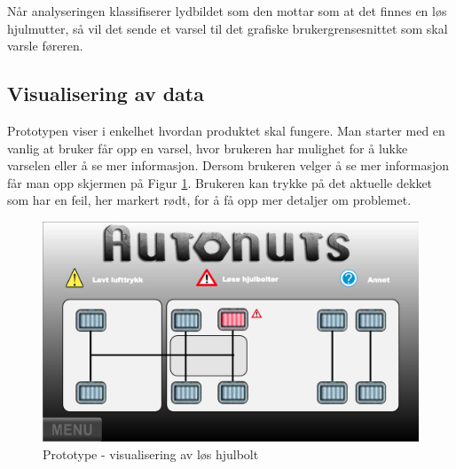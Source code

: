 Når analyseringen klassifiserer lydbildet som den mottar som at det finnes en løs hjulmutter, så vil det sende et varsel til det grafiske brukergrensesnittet som skal varsle føreren.

\subsection{Visualisering av data}
Prototypen viser i enkelhet hvordan produktet skal fungere. Man starter med en vanlig at bruker får opp en varsel, hvor brukeren har mulighet for å lukke varselen eller å se mer informasjon. Dersom brukeren velger å se mer informasjon får man opp skjermen på Figur \ref{fig:proto}. Brukeren kan trykke på det aktuelle dekket som har en feil, her markert rødt, for å få opp mer detaljer om problemet.
\begin{figure}[H]
		\centering
		\includegraphics[width=1.00\textwidth]{images/prototype.png}
		\caption{Prototype - visualisering av løs hjulbolt}
		\label{fig:proto}
	\end{figure}

